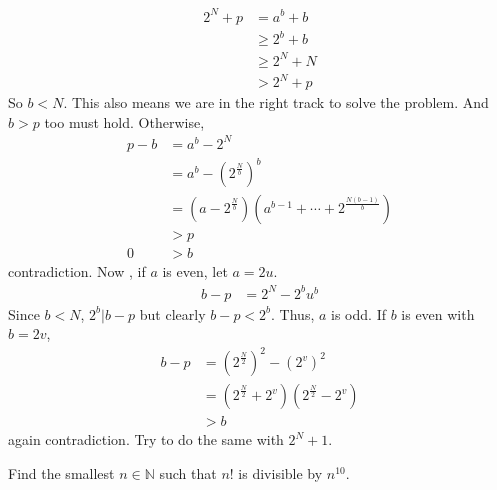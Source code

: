 \documentclass[problems.tex]{subfile}
\begin{document}
\begin{solution}
			\begin{align*}
				2^N+p & = a^b+b\\
					  &\geq2^b+b\\
					  &\geq2^N+N\\
					  & > 2^N+p
			\end{align*}
		So $b<N$. This also means we are in the right track to solve the problem. And $b>p$ too must hold. Otherwise,
			\begin{align*}
				p-b & = a^b-2^N\\
					& = a^b-\left(2^{\frac{N}{b}}\right)^b\\
					& = \left(a-2^{\frac{N}{b}}\right)\left(a^{b-1}+\cdots+2^{\frac{N(b-1)}{b}}\right)\\
					& > p\\
				0	& > b
			\end{align*}
		contradiction.  Now , if $a$ is even, let $a=2u$.
			\begin{align*}
				b-p & = 2^N-2^bu^b
			\end{align*}
		Since $b<N$, $2^b|b-p$ but clearly $b-p<2^b$. Thus, $a$ is odd. If $b$ is even with $b=2v$,
			\begin{align*}
				b-p & = \left(2^{\frac{N}{2}}\right)^2-\left(2^v\right)^2\\
					& = \left(2^{\frac{N}{2}}+2^v\right)\left(2^{\frac{N}{2}}-2^v\right)\\
					& > b
			\end{align*}
		again contradiction. Try to do the same with $2^N+1$.
	\end{solution}
	
	\begin{problem}[Columbia $2010$]
		Find the smallest $n\in\mathbb{N}$ such that $n!$ is divisible by $n^{10}$.
	\end{problem}
	
\end{document}
